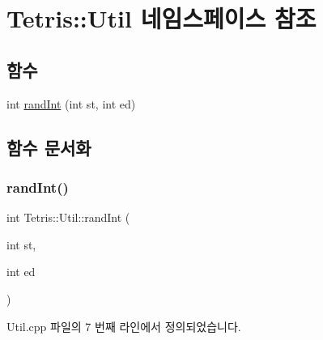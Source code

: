 \hypertarget{namespace_tetris_1_1_util}{}\section{Tetris\+:\+:Util 네임스페이스 참조}
\label{namespace_tetris_1_1_util}
\subsection*{함수}
\begin{DoxyCompactItemize}
\item 
int \hyperlink{namespace_tetris_1_1_util_aa590e9fd847ac6e0c9bc6bf464b5a74b}{rand\+Int} (int st, int ed)
\end{DoxyCompactItemize}


\subsection{함수 문서화}
\mbox{\label{namespace_tetris_1_1_util_aa590e9fd847ac6e0c9bc6bf464b5a74b}} 
\subsubsection{\texorpdfstring{rand\+Int()}{randInt()}}
{\footnotesize\ttfamily int Tetris\+::\+Util\+::rand\+Int (\begin{DoxyParamCaption}\item[{int}]{st,  }\item[{int}]{ed }\end{DoxyParamCaption})}



Util.\+cpp 파일의 7 번째 라인에서 정의되었습니다.

